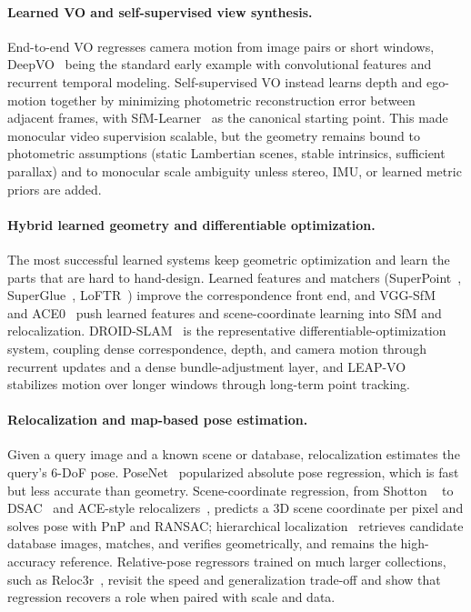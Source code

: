 \paragraph{Learned VO and self-supervised view synthesis.}
End-to-end VO regresses camera motion from image pairs or short windows, DeepVO~\cite{Wang2017DeepVO} being the standard early example with convolutional features and recurrent temporal modeling.
Self-supervised VO instead learns depth and ego-motion together by minimizing photometric reconstruction error between adjacent frames, with SfM-Learner~\cite{zhou2017unsupervised} as the canonical starting point.
This made monocular video supervision scalable, but the geometry remains bound to photometric assumptions (static Lambertian scenes, stable intrinsics, sufficient parallax) and to monocular scale ambiguity unless stereo, IMU, or learned metric priors are added.

\paragraph{Hybrid learned geometry and differentiable optimization.}
The most successful learned systems keep geometric optimization and learn the parts that are hard to hand-design.
Learned features and matchers (SuperPoint~\cite{detone2018superpoint}, SuperGlue~\cite{sarlin2020superglue}, LoFTR~\cite{Sun2021LoFTR}) improve the correspondence front end, and VGG-SfM~\cite{Vggsfm} and ACE0~\cite{acezero} push learned features and scene-coordinate learning into SfM and relocalization.
DROID-SLAM~\cite{teed2021droid} is the representative differentiable-optimization system, coupling dense correspondence, depth, and camera motion through recurrent updates and a dense bundle-adjustment layer, and LEAP-VO~\cite{chen2024leap} stabilizes motion over longer windows through long-term point tracking.

\paragraph{Relocalization and map-based pose estimation.}
Given a query image and a known scene or database, relocalization estimates the query's 6-DoF pose.
PoseNet~\cite{kendall2015posenet} popularized absolute pose regression, which is fast but less accurate than geometry.
Scene-coordinate regression, from Shotton \etal~\cite{Scene_Coordinate} to DSAC~\cite{brachmann2017dsac} and ACE-style relocalizers~\cite{acezero}, predicts a 3D scene coordinate per pixel and solves pose with PnP and RANSAC; hierarchical localization~\cite{sarlin2019coarse} retrieves candidate database images, matches, and verifies geometrically, and remains the high-accuracy reference.
Relative-pose regressors trained on much larger collections, such as Reloc3r~\cite{reloc3r}, revisit the speed and generalization trade-off and show that regression recovers a role when paired with scale and data.

